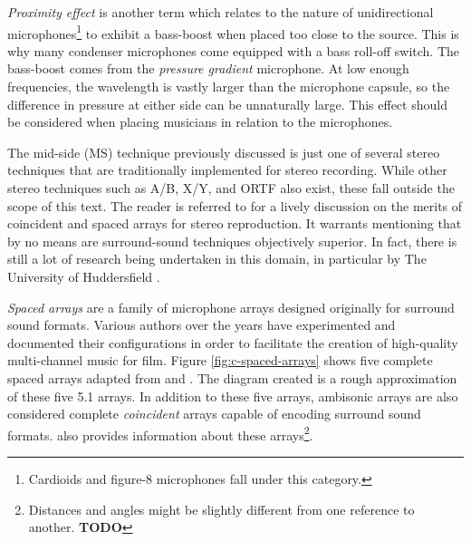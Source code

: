 \textit{Proximity effect} is another term which relates to the nature of unidirectional microphones\footnote{Cardioids and figure-8 microphones fall under this category.} to exhibit a bass-boost when placed too close to the source. This is why many condenser microphones come equipped with a bass roll-off switch. The bass-boost comes from the \textit{pressure gradient} microphone. At low enough frequencies, the wavelength is vastly larger than the microphone capsule, so the difference in pressure at either side can be unnaturally large. This effect should be considered when placing musicians in relation to the microphones.

The mid-side (MS) technique previously discussed is just one of several stereo techniques that are traditionally implemented for stereo recording. While other stereo techniques such as A/B, X/Y, and ORTF also exist, these fall outside the scope of this text. The reader is referred to \cite{lipshitz1986stereo} for a lively discussion on the merits of coincident and spaced arrays for stereo reproduction. It warrants mentioning that by no means are surround-sound techniques objectively superior. In fact, there is still a lot of research being undertaken in this domain, in particular by The University of Huddersfield \cite{lee3d}. 

\textit{Spaced arrays} are a family of microphone arrays designed originally for surround sound formats. Various authors over the years have experimented and documented their configurations in order to facilitate the creation of high-quality multi-channel music for film. Figure \ref{fig:c-spaced-arrays} shows five complete spaced arrays adapted from \cite{hacihabiboglu2017perceptual} and \cite{politis2016microphone}. The diagram created is a rough approximation of these five 5.1 arrays. In addition to these five arrays, ambisonic arrays are also considered complete \textit{coincident} arrays capable of encoding surround sound formats. \cite{Immersiv9:online} also provides information about these arrays\footnote{Distances and angles might be slightly different from one reference to another. \textbf{TODO}}.

